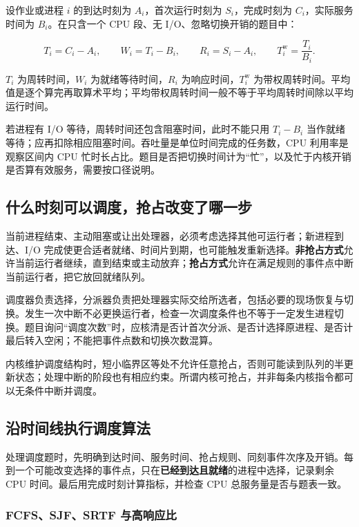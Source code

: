 设作业或进程 \(i\) 的到达时刻为 \(A_i\)，首次运行时刻为 \(S_i\)，完成时刻为 \(C_i\)，实际服务时间为 \(B_i\)。在只含一个 CPU 段、无 I/O、忽略切换开销的题目中：

\[
T_i=C_i-A_i,\qquad W_i=T_i-B_i,\qquad R_i=S_i-A_i,\qquad T_i^{\mathrm{w}}=\frac{T_i}{B_i}.
\]

\(T_i\) 为周转时间，\(W_i\) 为就绪等待时间，\(R_i\) 为响应时间，\(T_i^{\mathrm{w}}\) 为带权周转时间。平均值是逐个算完再取算术平均；平均带权周转时间一般不等于平均周转时间除以平均运行时间。

若进程有 I/O 等待，周转时间还包含阻塞时间，此时不能只用 \(T_i-B_i\) 当作就绪等待；应再扣除相应阻塞时间。吞吐量是单位时间完成的任务数，CPU 利用率是观察区间内 CPU 忙时长占比。题目是否把切换时间计为``忙''，以及忙于内核开销是否算有效服务，需要按口径说明。

\subsection{什么时刻可以调度，抢占改变了哪一步}\label{OS02-2-7}

当前进程结束、主动阻塞或让出处理器，必须考虑选择其他可运行者；新进程到达、I/O 完成使更合适者就绪、时间片到期，也可能触发重新选择。\textbf{非抢占方式}允许当前运行者继续，直到结束或主动放弃；\textbf{抢占方式}允许在满足规则的事件点中断当前运行者，把它放回就绪队列。

调度器负责选择，分派器负责把处理器实际交给所选者，包括必要的现场恢复与切换。发生一次中断不必更换运行者，检查一次调度条件也不等于一定发生进程切换。题目询问``调度次数''时，应核清是否计首次分派、是否计选择原进程、是否计最后转入空闲；不能把事件点数和切换次数混算。

内核维护调度结构时，短小临界区等处不允许任意抢占，否则可能读到队列的半更新状态；处理中断的阶段也有相应约束。所谓内核可抢占，并非每条内核指令都可以无条件中断并调度。

\subsection{沿时间线执行调度算法}\label{OS02-2-8}

处理调度题时，先明确到达时间、服务时间、抢占规则、同刻事件次序及开销。每到一个可能改变选择的事件点，只在\textbf{已经到达且就绪}的进程中选择，记录剩余 CPU 时间。最后用完成时刻计算指标，并检查 CPU 总服务量是否与题表一致。

\subsubsection{FCFS、SJF、SRTF 与高响应比}\label{OS02-auto-1}

